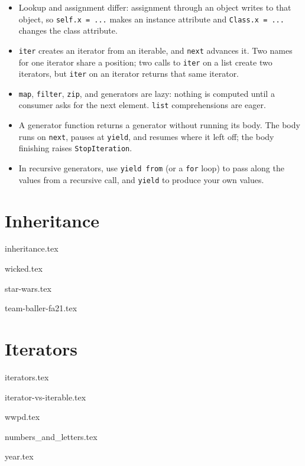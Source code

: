 \documentclass{exam}
\begin{document}
\begin{meta}
\begin{itemize}
    \item Lookup and assignment differ: assignment through an object writes to that object, so \lstinline{self.x = ...} makes an instance attribute and \lstinline{Class.x = ...} changes the class attribute.
    \item \lstinline{iter} creates an iterator from an iterable, and \lstinline{next} advances it. Two names for one iterator share a position; two calls to \lstinline{iter} on a list create two iterators, but \lstinline{iter} on an iterator returns that same iterator.
    \item \lstinline{map}, \lstinline{filter}, \lstinline{zip}, and generators are lazy: nothing is computed until a consumer asks for the next element. \lstinline{list} comprehensions are eager.
    \item A generator function returns a generator without running its body. The body runs on \lstinline{next}, pauses at \lstinline{yield}, and resumes where it left off; the body finishing raises \lstinline{StopIteration}.
    \item In recursive generators, use \lstinline{yield from} (or a \lstinline{for} loop) to pass along the values from a recursive call, and \lstinline{yield} to produce your own values.
\end{itemize}
\end{meta}

\section{Inheritance}
\begingroup
{inheritance.tex}
\endgroup
\begin{questions}
    {wicked.tex}

    {star-wars.tex}

    {team-baller-fa21.tex}
\end{questions}

\section{Iterators}
\begingroup
{iterators.tex}
\endgroup
\begin{questions}
    \setcounter{question}{3}
    {iterator-vs-iterable.tex}

    {wwpd.tex}

    {numbers_and_letters.tex}

    {year.tex}
\end{questions}
\end{document}
